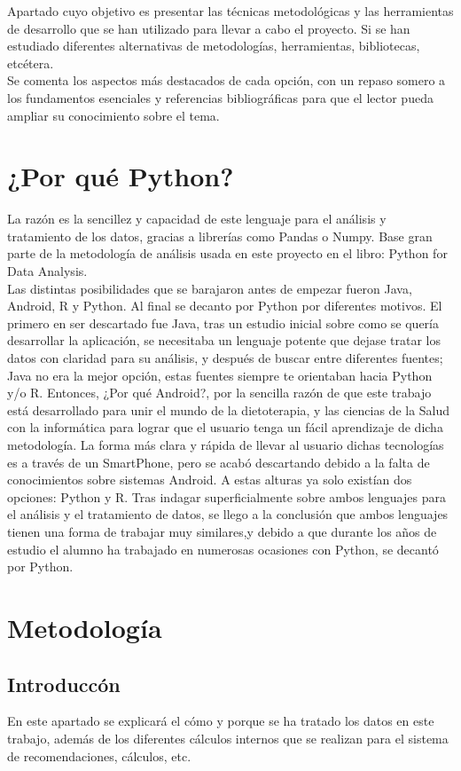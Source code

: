 
Apartado cuyo objetivo es presentar las técnicas metodológicas y las herramientas de desarrollo que se han utilizado para llevar a cabo el proyecto. Si se han estudiado diferentes alternativas de metodologías, herramientas, bibliotecas, etcétera.\\

Se comenta los aspectos más destacados de cada opción, con un repaso somero a los fundamentos esenciales y referencias bibliográficas para que el lector pueda ampliar su conocimiento sobre el tema.
\section{¿Por qué Python?}
La razón es la sencillez y capacidad de este lenguaje para el análisis y tratamiento de los datos, gracias a librerías como Pandas o Numpy. Base gran parte de la metodología de análisis usada en este proyecto en el libro: Python for Data Analysis. \cite{pythonDataAnalisis}
\\ 
Las distintas posibilidades que se barajaron antes de empezar fueron Java, Android, R y Python. Al final se decanto por Python por diferentes motivos. El primero en ser descartado fue Java, tras un estudio inicial sobre como se quería desarrollar la aplicación, se necesitaba un lenguaje potente que  dejase tratar los datos con claridad para su análisis, y después de buscar entre diferentes fuentes; Java no era la mejor opción, estas fuentes siempre te orientaban hacia Python y/o R. Entonces, ¿Por qué Android?, por la sencilla razón de que este trabajo está desarrollado para unir el mundo de la dietoterapia, y las ciencias de la Salud con la informática para lograr que el usuario tenga un fácil aprendizaje de dicha metodología. La forma más clara y rápida de llevar al usuario dichas tecnologías es a través de un  SmartPhone, pero se acabó descartando debido a la falta de conocimientos sobre sistemas Android. A estas alturas ya solo existían dos opciones:  Python y R. Tras indagar superficialmente sobre ambos lenguajes para el análisis y el tratamiento de datos, se llego a la conclusión que ambos lenguajes tienen una forma de trabajar muy similares,y  debido a que durante los años de estudio el alumno ha trabajado en numerosas ocasiones con Python, se decantó por Python.
\section{Metodología}
\subsection{Introduccón}
En este apartado se explicará el cómo y porque se ha tratado los datos en este trabajo,  además de los diferentes cálculos internos que se realizan para el sistema de recomendaciones, cálculos, etc.
